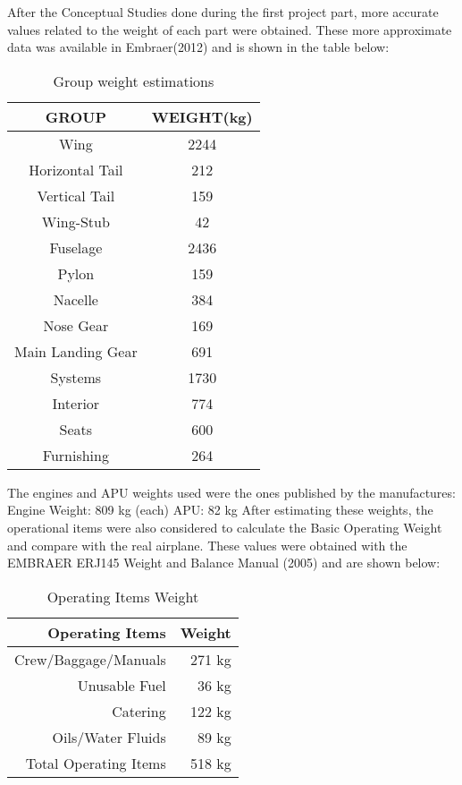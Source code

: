 ﻿After the Conceptual Studies done during the first project part, more accurate values related to the weight of each part were obtained. These more approximate data was available in Embraer(2012) and is shown in the table below:

\begin{table}[htbp]
  \centering
  \caption{Group weight estimations}
    \begin{tabular}{cc}
    \toprule
    \textbf{GROUP} & \textbf{WEIGHT(kg)} \\
    \midrule
    Wing  & 2244 \\
    Horizontal Tail & 212 \\
    Vertical Tail & 159 \\
    Wing-Stub & 42 \\
    Fuselage & 2436 \\
    Pylon & 159 \\
    Nacelle & 384 \\
    Nose Gear & 169 \\
    Main Landing Gear & 691 \\
    Systems & 1730 \\
    Interior & 774 \\
    Seats & 600 \\
    Furnishing & 264 \\
    \bottomrule
    \end{tabular}%
  \label{tab:groupweight}%
\end{table}%

 The engines and APU weights used were the ones published by the manufactures:
                Engine Weight: 809 kg (each)
                APU: 82 kg
After estimating these weights, the operational items were also considered to calculate the Basic Operating Weight and compare with the real airplane. These values were obtained with the EMBRAER ERJ145 Weight and Balance Manual (2005) and are shown below:

\begin{table}[htbp]
  \centering
  \caption{Operating Items Weight}
    \begin{tabular}{rr}
    \toprule
    \textbf{Operating Items} & \textbf{Weight} \\
    \midrule
    Crew/Baggage/Manuals & 271 kg \\
    Unusable Fuel & 36 kg \\
    Catering & 122 kg \\
    Oils/Water Fluids & 89 kg \\
    Total Operating Items & 518 kg \\
    \bottomrule
    \end{tabular}%
  \label{tab:operationweight}%
\end{table}%


